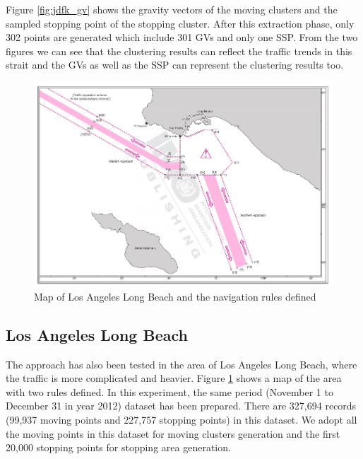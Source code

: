 \documentclass[12pt,glossary]{dalcsthesis}
\begin{document}
Figure \ref{fig:jdfk_gv} shows the gravity vectors of the moving clusters and the sampled stopping point of the stopping cluster. After this extraction phase, only 302 points are generated which include 301 GVs and only one SSP. From the two figures we can see that the clustering results can reflect the traffic trends in this strait and the GVs as well as the SSP can represent the clustering results too.

\begin{figure}[!htb]
\centering
\includegraphics[width=4.6in]{la_pic.png}
\caption{Map of Los Angeles Long Beach and the navigation rules defined \cite{anabook}}
\label{fig:la_pic}
\end{figure}

\subsection{Los Angeles Long Beach}
\label{sec:exp_1.2}
The approach has also been tested in the area of Los Angeles Long Beach, where the traffic is more complicated and heavier. Figure \ref{fig:la_pic} shows a map of the area with two rules defined. In this experiment, the same period (November 1 to December 31 in year 2012) dataset has been prepared. There are 327,694 records (99,937 moving points and 227,757 stopping points) in this dataset. We adopt all the moving points in this dataset for moving clusters generation and the first 20,000 stopping points for stopping area generation.
\end{document}

